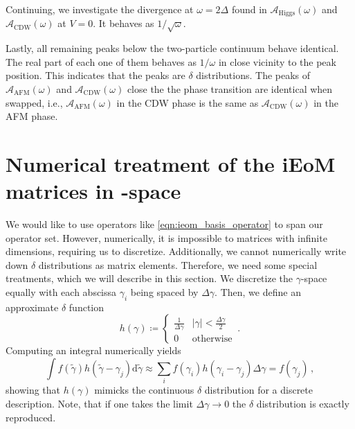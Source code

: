\documentclass[
    reprint, 
    aps,
    preprintnumbers,
    twocolumn,
    prb,
    superscriptaddress
]{revtex4-2}
\newcommand{\spectral}[1]{\mathcal{A}_\text{#1}  (\omega)}
\def\hmath$#1${\texorpdfstring{{\rmfamily\textit{#1}}}{#1}}
\begin{document}
Continuing, we investigate the divergence at $\omega = 2\Delta$ found in $\spectral{Higgs}$ and $\spectral{CDW}$ at $V=0$. It behaves as $1/\sqrt{\omega}$.

Lastly, all remaining peaks below the two-particle continuum behave identical.
The real part of each one of them behaves as $1/\omega$ in close vicinity to the peak position.
This indicates that the peaks are $\delta$ distributions.
The peaks of $\spectral{AFM}$ and $\spectral{CDW}$ close the the phase transition are identical when swapped, 
i.e., $\spectral{AFM}$ in the CDW phase is the same as $\spectral{CDW}$ in the AFM phase.

\section{Numerical treatment of the iEoM matrices in \hmath $\gamma$-space}
\label{sec:numerical_ieom}

We would like to use operators like \eqref{eqn:ieom_basis_operator} to span our operator set.
However, numerically, it is impossible to matrices with infinite dimensions, requiring us to discretize.
Additionally, we cannot numerically write down $\delta$ distributions as matrix elements. Therefore, we need some special treatments, which we will describe in this section.
We discretize the $\gamma$-space equally with each abscissa $\gamma_i$ being spaced by $\Delta \gamma$.
Then, we define an approximate $\delta$ function
\begin{equation}
    h(\gamma) \coloneqq \begin{cases}
        \frac{1}{\Delta \gamma} & |\gamma| < \frac{\Delta \gamma}{2} \\ 0 & \text{otherwise}
    \end{cases}\,.
\end{equation}
Computing an integral numerically yields
\begin{equation}
    \int f(\tilde{\gamma}) h(\tilde{\gamma} - \gamma_j) \mathrm{d} \tilde{\gamma} \approx \sum_i f(\gamma_i) h(\gamma_i - \gamma_j) \Delta \gamma = f(\gamma_j)\,,
\end{equation}
showing that $h(\gamma)$ mimicks the continuous $\delta$ distribution for a discrete description.
Note, that if one takes the limit $\Delta \gamma \to 0$ the $\delta$ distribution is exactly reproduced.
\end{document}
